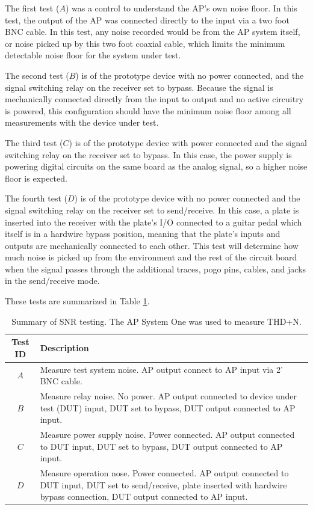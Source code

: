 \documentclass{article}
\begin{document}
	The first test ($A$) was a control to understand the AP's own noise floor.  In this test, the output of the AP was connected directly to the input via a two foot BNC cable.  In this test, any noise recorded would be from the AP system itself, or noise picked up by this two foot coaxial cable, which limits the minimum detectable noise floor for the system under test.

	The second test ($B$) is of the prototype device with no power connected, and the signal switching relay on the receiver set to bypass.  Because the signal is mechanically connected directly from the input to output and no active circuitry is powered, this configuration should have the minimum noise floor among all measurements with the device under test.

	The third test ($C$) is of the prototype device with power connected and the signal switching relay on the receiver set to bypass.  In this case, the power supply is powering digital circuits on the same board as the analog signal, so a higher noise floor is expected.

	The fourth test ($D$) is of the prototype device with no power connected and the signal switching relay on the receiver set to send/receive.  In this case, a plate is inserted into the receiver with the plate's I/O connected to a guitar pedal which itself is in a hardwire bypass position, meaning that the plate's inputs and outputs are mechanically connected to each other.  This test will determine how much noise is picked up from the environment and the rest of the circuit board when the signal passes through the additional traces, pogo pins, cables, and jacks in the send/receive mode.

	These tests are summarized in Table \ref{tab:SNRtests}.

	\begin{table}
	\begin{center}
	\begin{tabular}{ |c p{8cm}| }
	\hline
	Test ID & Description \\ 
	\hline
	$A$ & Measure test system noise.  AP output connect to AP input via 2' BNC cable. \\
	$B$ & Measure relay noise.  No power.   AP output connected to device under test (DUT) input, DUT set to bypass, DUT output connected to AP input. \\
	$C$ & Measure power supply noise.  Power connected.  AP output connected to DUT input, DUT set to bypass, DUT output connected to AP input. \\
	$D$ & Measure operation nose.  Power connected.   AP output connected to DUT input, DUT set to send/receive, plate inserted with hardwire bypass connection, DUT output connected to AP input.\\
   	\hline
	\end{tabular}
	\caption{Summary of SNR testing.  The AP System One was used to measure THD+N.}
	\label{tab:SNRtests}
	\end{center}
	\end{table}
\end{document}

